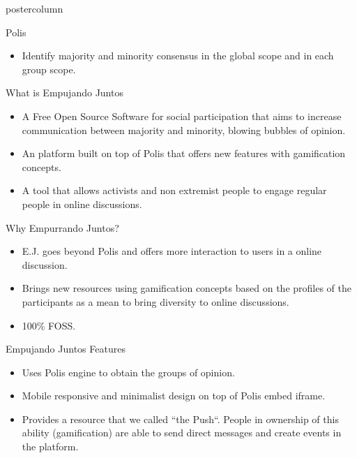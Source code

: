 \documentclass[final,hyperref={pdfpagelabels=false}]{beamer}
\begin{document}
\begin{frame}
\begin{columns}
\begin{column}{.49\textwidth}
\begin{beamercolorbox}[center,wd=\textwidth]{postercolumn}
\begin{minipage}[T]{.95\textwidth}
{\begin{block}{Polis}
\begin{itemize}
    \item Identify majority and minority consensus in the global scope and in
    each group scope.
  \end{itemize}
\end{block}

\begin{block}{What is Empujando Juntos}

  \begin{itemize}
    \item A Free Open Source Software for social participation that aims to
    increase communication between majority and minority, blowing bubbles of
    opinion.

    \item An platform built on top of Polis that offers new features
    with gamification concepts.
    
    \item A tool that allows activists and non extremist people to engage regular
    people in online discussions.
  \end{itemize}
\end{block}

\begin{block}{Why Empurrando Juntos?}
  \begin{itemize}
    \item E.J. goes beyond Polis and offers more interaction to users in a online
    discussion.

    \item Brings new resources using gamification concepts based on the profiles
    of the participants as a mean to bring diversity to online discussions.

    \item 100\% FOSS.
  \end{itemize}
\end{block}


\begin{block}{Empujando Juntos Features}
  \begin{itemize}
    \item Uses Polis engine to obtain the groups of opinion.

    \item Mobile responsive and minimalist design on top of Polis embed iframe.

    \item Provides a resource that we called ``the Push``. People in ownership of
    this ability (gamification) are able to send direct messages and create events in the platform.


\end{itemize}
\end{block}}
\end{minipage}
\end{beamercolorbox}
\end{column}
\end{columns}
\end{frame}
\end{document}
